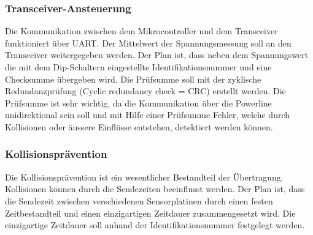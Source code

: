 \subsubsection{Transceiver-Ansteuerung}
Die Kommunikation zwischen dem Mikrocontroller und dem Transceiver funktioniert über UART. 
Der Mittelwert der Spannungsmessung soll an den Transceiver weitergegeben werden. Der Plan ist, dass neben dem Spannungswert die mit dem Dip-Schaltern eingestellte Identifikationsnummer und eine Checksumme übergeben wird. Die Prüfsumme soll mit der zyklische Redundanzprüfung (Cyclic redundancy check = CRC)  erstellt werden. Die Prüfsumme ist sehr wichtig, da die Kommunikation über die Powerline unidirektional sein soll und  mit Hilfe einer Prüfsumme Fehler, welche durch Kollisionen oder äussere Einflüsse entstehen, detektiert werden können.

\subsubsection{Kollisionsprävention}
Die Kollisionsprävention ist ein wesentlicher Bestandteil der Übertragung. Kollisionen können durch die Sendezeiten beeinflusst werden. Der Plan ist, dass die Sendezeit zwischen verschiedenen Sensorplatinen durch einen festen Zeitbestandteil und einen einzigartigen Zeitdauer zusammengesetzt wird. Die einzigartige Zeitdauer soll anhand der Identifikationsnummer festgelegt werden.















